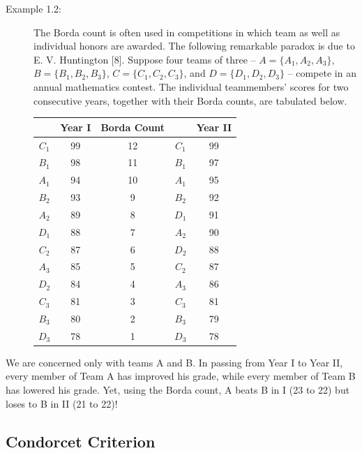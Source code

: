 \documentclass{article}
\begin{document}
\begin{description}

\item[Example 1.2:] The Borda count is often used in competitions in which team as well as individual honors are awarded. The following remarkable paradox is due to E. V. Huntington [8]. Suppose four teams of three -- $A = \{ A_{1}, A_{2}, A_{3} \}$, $B = \{ B_{1}, B_{2}, B_{3} \}$, $C = \{ C_{1}, C_{2}, C_{3} \}$, and $D = \{ D_{1}, D_{2}, D_{3} \}$ -- compete in an annual mathematics contest. The individual teammembers' scores for two consecutive years, together with their Borda counts, are tabulated below.
\begin{center}
\begin{tabular}{cc |c| cc}
          & Year I & Borda Count &         & Year II \\
  \hline
  $C_{1}$ &     99 &          12 & $C_{1}$ &      99 \\
  $B_{1}$ &     98 &          11 & $B_{1}$ &      97 \\
  $A_{1}$ &     94 &          10 & $A_{1}$ &      95 \\
  $B_{2}$ &     93 &           9 & $B_{2}$ &      92 \\
  $A_{2}$ &     89 &           8 & $D_{1}$ &      91 \\
  $D_{1}$ &     88 &           7 & $A_{2}$ &      90 \\
  $C_{2}$ &     87 &           6 & $D_{2}$ &      88 \\
  $A_{3}$ &     85 &           5 & $C_{2}$ &      87 \\
  $D_{2}$ &     84 &           4 & $A_{3}$ &      86 \\
  $C_{3}$ &     81 &           3 & $C_{3}$ &      81 \\
  $B_{3}$ &     80 &           2 & $B_{3}$ &      79 \\
  $D_{3}$ &     78 &           1 & $D_{3}$ &      78 \\
\end{tabular}
\end{center}


\end{description}

We are concerned only with teams A and B. In passing from Year I to Year II, every member of Team A has improved his grade, while every member of Team B has lowered his grade. Yet, using the Borda count, A beats B in I (23 to 22) but loses to B in II (21 to 22)!


\subsection*{Condorcet Criterion}
\end{document}
